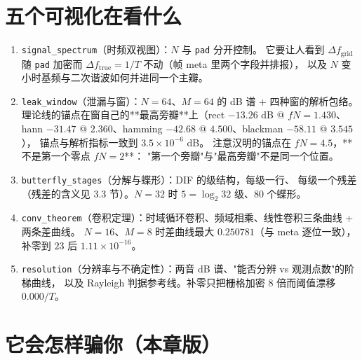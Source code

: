 \section{五个可视化在看什么}

\begin{enumerate}
  \item \texttt{signal\_spectrum}（时频双视图）：$N$ 与 \texttt{pad} 分开控制。
        它要让人看到 $\Delta f_{\text{grid}}$ 随 \texttt{pad} 加密而
        $\Delta f_{\text{true}}=1/T$ 不动（帧 meta 里两个字段并排报），
        以及 $N$ 变小时基频与二次谐波如何并进同一个主瓣。
  \item \texttt{leak\_window}（泄漏与窗）：$N=64$、$M=64$ 的 dB 谱 + 四种窗的解析包络。
        理论线的锚点在窗自己的**最高旁瓣**上（rect $-13.26$ dB @ $fN=1.430$、
        hann $-31.47$ @ $2.360$、hamming $-42.68$ @ $4.500$、blackman $-58.11$ @ $3.545$），
        锚点与解析指标一致到 $3.5\times10^{-6}$ dB。
        注意汉明的锚点在 $fN=4.5$，**不是第一个零点 $fN=2$**：
        "第一个旁瓣"与"最高旁瓣"不是同一个位置。
  \item \texttt{butterfly\_stages}（分解与蝶形）：DIF 的级结构，每级一行、
        每级一个残差（残差的含义见 3.3 节）。$N=32$ 时 $5=\log_2 32$ 级、$80$ 个蝶形。
  \item \texttt{conv\_theorem}（卷积定理）：时域循环卷积、频域相乘、线性卷积三条曲线 + 两条差曲线。
        $N=16$、$M=8$ 时差曲线最大 $0.250781$（与 meta 逐位一致），
        补零到 $23$ 后 $1.11\times10^{-16}$。
  \item \texttt{resolution}（分辨率与不确定性）：两音 dB 谱、"能否分辨 vs 观测点数"的阶梯曲线，
        以及 Rayleigh 判据参考线。补零只把栅格加密 $8$ 倍而阈值漂移 $0.000/T$。
\end{enumerate}



\section{它会怎样骗你（本章版）}

